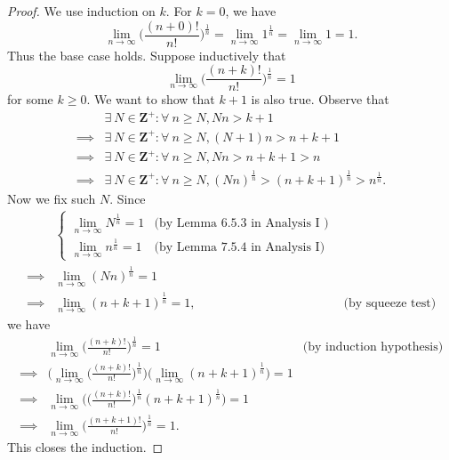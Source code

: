 \begin{proof}
    We use induction on \(k\).
    For \(k = 0\), we have
    \[
        \lim_{n \to \infty} \bigg(\frac{(n + 0)!}{n!}\bigg)^{\frac{1}{n}} = \lim_{n \to \infty} 1^{\frac{1}{n}} = \lim_{n \to \infty} 1 = 1.
    \]
    Thus the base case holds.
    Suppose inductively that
    \[
        \lim_{n \to \infty} \bigg(\frac{(n + k)!}{n!}\bigg)^{\frac{1}{n}} = 1
    \]
    for some \(k \geq 0\).
    We want to show that \(k + 1\) is also true.
    Observe that
    \begin{align*}
                 & \exists\ N \in \mathbf{Z}^+ : \forall\ n \geq N, Nn > k + 1                                                        \\
        \implies & \exists\ N \in \mathbf{Z}^+ : \forall\ n \geq N, (N + 1)n > n + k + 1                                              \\
        \implies & \exists\ N \in \mathbf{Z}^+ : \forall\ n \geq N, Nn > n + k + 1 > n                                                \\
        \implies & \exists\ N \in \mathbf{Z}^+ : \forall\ n \geq N, (Nn)^{\frac{1}{n}} > (n + k + 1)^{\frac{1}{n}} > n^{\frac{1}{n}}.
    \end{align*}
    Now we fix such \(N\).
    Since
    \begin{align*}
                 & \begin{cases}
            \lim_{n \to \infty} N^{\frac{1}{n}} = 1 & \text{(by Lemma 6.5.3 in Analysis I )} \\
            \lim_{n \to \infty} n^{\frac{1}{n}} = 1 & \text{(by Lemma 7.5.4 in Analysis I)}
        \end{cases}                                                     \\
        \implies & \lim_{n \to \infty} (Nn)^{\frac{1}{n}} = 1                                    \\
        \implies & \lim_{n \to \infty} (n + k + 1)^{\frac{1}{n}} = 1, & \text{(by squeeze test)}
    \end{align*}
    we have
    \begin{align*}
                 & \lim_{n \to \infty} \bigg(\frac{(n + k)!}{n!}\bigg)^{\frac{1}{n}} = 1                                                                       & \text{(by induction hypothesis)} \\
        \implies & \Bigg(\lim_{n \to \infty} \bigg(\frac{(n + k)!}{n!}\bigg)^{\frac{1}{n}}\Bigg) \bigg(\lim_{n \to \infty} (n + k + 1)^{\frac{1}{n}}\bigg) = 1                                    \\
        \implies & \lim_{n \to \infty} \Bigg(\bigg(\frac{(n + k)!}{n!}\bigg)^{\frac{1}{n}} (n + k + 1)^{\frac{1}{n}}\Bigg) = 1                                                                    \\
        \implies & \lim_{n \to \infty} \bigg(\frac{(n + k + 1)!}{n!}\bigg)^{\frac{1}{n}} = 1.
    \end{align*}
    This closes the induction.
\end{proof}

